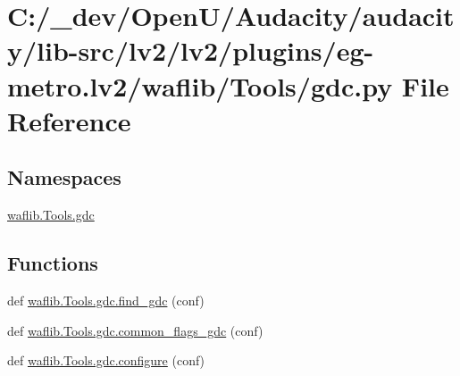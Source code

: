 \hypertarget{lv2_2plugins_2eg-metro_8lv2_2waflib_2_tools_2gdc_8py}{}\section{C\+:/\+\_\+dev/\+Open\+U/\+Audacity/audacity/lib-\/src/lv2/lv2/plugins/eg-\/metro.lv2/waflib/\+Tools/gdc.py File Reference}
\label{lv2_2plugins_2eg-metro_8lv2_2waflib_2_tools_2gdc_8py}
\subsection*{Namespaces}
\begin{DoxyCompactItemize}
\item 
 \hyperlink{namespacewaflib_1_1_tools_1_1gdc}{waflib.\+Tools.\+gdc}
\end{DoxyCompactItemize}
\subsection*{Functions}
\begin{DoxyCompactItemize}
\item 
def \hyperlink{namespacewaflib_1_1_tools_1_1gdc_a1cd5f335a15d375707119a14d470eb68}{waflib.\+Tools.\+gdc.\+find\+\_\+gdc} (conf)
\item 
def \hyperlink{namespacewaflib_1_1_tools_1_1gdc_a559e20c4ab6c3d2f15571b2a6abcebff}{waflib.\+Tools.\+gdc.\+common\+\_\+flags\+\_\+gdc} (conf)
\item 
def \hyperlink{namespacewaflib_1_1_tools_1_1gdc_aa2ddc4f30ce9ee26ba9d494193c2efae}{waflib.\+Tools.\+gdc.\+configure} (conf)
\end{DoxyCompactItemize}
